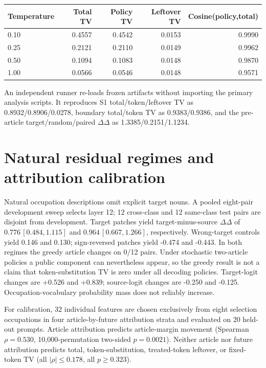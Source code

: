 \begin{center}
\small
\begin{tabular}{lrrrr}
\toprule
Temperature & Total TV & Policy TV & Leftover TV & Cosine(policy,total) \\
\midrule
0.10 & 0.4557 & 0.4542 & 0.0153 & 0.9990 \\
0.25 & 0.2121 & 0.2110 & 0.0149 & 0.9962 \\
0.50 & 0.1094 & 0.1083 & 0.0148 & 0.9870 \\
1.00 & 0.0566 & 0.0546 & 0.0148 & 0.9571 \\
\bottomrule
\end{tabular}
\end{center}

An independent runner re-loads frozen artifacts without importing the
primary analysis scripts. It reproduces S1 total/token/leftover TV as
0.8932/0.8906/0.0278, boundary total/token TV as 0.9383/0.9386, and the
pre-article target/random/paired \(\Delta\Delta\) as
1.3385/0.2151/1.1234.

\section{Natural residual regimes and attribution calibration}
\label{app:natural-calibration}

Natural occupation descriptions omit explicit target nouns. A pooled
eight-pair development sweep selects layer 12; 12 cross-class and 12
same-class test pairs are disjoint from development. Target patches yield
target-minus-source \(\Delta\Delta\) of
\(0.776\,[0.484,1.115]\) and \(0.964\,[0.667,1.266]\), respectively.
Wrong-target controls yield 0.146 and 0.130; sign-reversed patches yield
-0.474 and -0.443. In both regimes the greedy article changes on 0/12 pairs.
Under stochastic two-article policies a public component can nevertheless
appear, so the greedy result is not a claim that token-substitution TV is zero
under all decoding policies. Target-logit changes are +0.526 and +0.839; source-logit changes
are -0.250 and -0.125. Occupation-vocabulary probability mass does not
reliably increase.

For calibration, 32 individual features are chosen exclusively from eight
selection occupations in four article-by-future attribution strata and
evaluated on 20 held-out prompts. Article attribution predicts
article-margin movement (Spearman \(\rho=0.530\), 10,000-permutation
two-sided \(p=0.0021\)). Neither article nor future attribution predicts
total, token-substitution, treated-token leftover, or fixed-token TV
(all \(|\rho|\le0.178\), all \(p\ge0.323\)).

